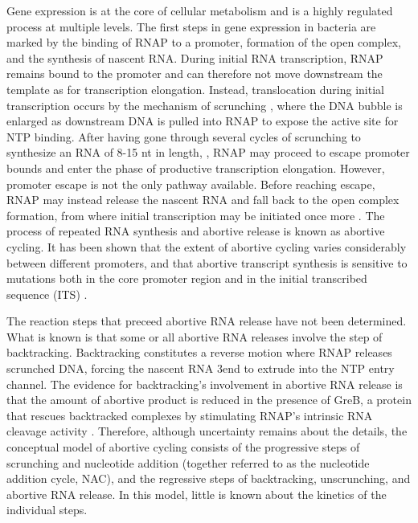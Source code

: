 %
Gene expression is at the core of cellular metabolism and is a highly regulated
process at multiple levels. The first steps in gene expression in bacteria are
marked by the binding of RNAP to a promoter, formation of the open complex,
and the synthesis of nascent RNA. During initial RNA transcription, RNAP
remains bound to the promoter and can therefore not move downstream the template as
for transcription elongation. Instead, translocation during
initial transcription occurs by the mechanism of scrunching
\cite{revyakin_abortive_2006, kapanidis_initial_2006}, where the DNA bubble is
enlarged as downstream DNA is pulled into RNAP to expose the active site for
NTP binding. After having gone through several cycles of scrunching to
synthesize an RNA of 8-15 nt in length,
\cite{carpousis_cycling_1980,hsu_vitro_2003,tang_real-time_2009,hsu_initial_2006},
RNAP may proceed to escape promoter bounds and enter the phase of productive
transcription elongation. However, promoter escape is not the only pathway
available. Before reaching escape, RNAP may instead release the
nascent RNA and fall back to the open complex formation, from where initial
transcription may be initiated once more \cite{carpousis_cycling_1980}. The
process of repeated RNA synthesis and abortive release is known as abortive
cycling. It has been shown that the extent of abortive cycling varies
considerably between different promoters, and that abortive transcript
synthesis is sensitive to mutations both in the core promoter region and in
the initial transcribed sequence (ITS) \cite{hsu_initial_2006,
hsu_promoter_2002, vo_vitro_2003}.

The reaction steps that preceed abortive RNA release have not been determined.
What is known is that some or all abortive RNA releases involve the step of
backtracking. Backtracking constitutes a reverse motion where RNAP releases
scrunched DNA, forcing the nascent RNA 3\ppp end to extrude into the NTP entry
channel. The evidence for backtracking's involvement in abortive RNA release
is that the amount of abortive product is reduced in the presence of GreB, a
protein that rescues backtracked complexes by stimulating RNAP's intrinsic RNA
cleavage activity
\cite{hsu_initial_2006,hsu_escherichia_1995,feng_grea-induced_1994}.
Therefore, although uncertainty remains about the details, the conceptual
model of abortive cycling consists of the progressive steps of scrunching and
nucleotide addition (together referred to as the nucleotide addition cycle,
NAC), and the regressive steps of backtracking, unscrunching, and abortive RNA
release. In this model, little is known about the kinetics of the individual
steps.


